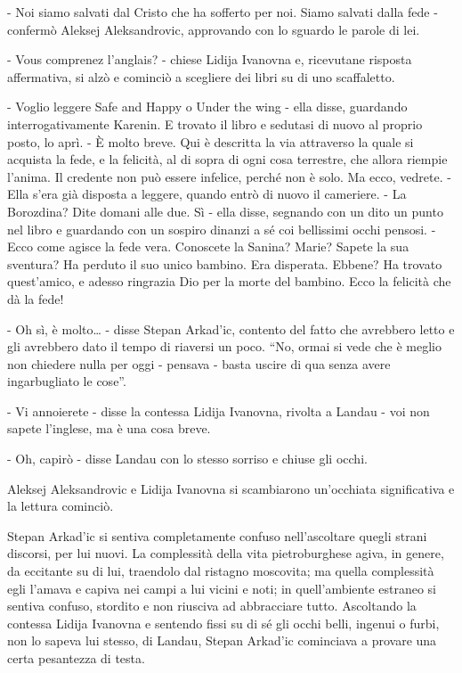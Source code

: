 - Noi siamo salvati dal Cristo che ha sofferto per noi. Siamo salvati dalla fede - confermò Aleksej Aleksandrovic, approvando con lo sguardo le parole di lei. 

- Vous comprenez l'anglais? - chiese Lidija Ivanovna e, ricevutane risposta affermativa, si alzò e cominciò a scegliere dei libri su di uno scaffaletto. 

- Voglio leggere Safe and Happy o Under the wing - ella disse, guardando interrogativamente Karenin. E trovato il libro e sedutasi di nuovo al proprio posto, lo aprì. - È molto breve. Qui è descritta la via attraverso la quale si acquista la fede, e la felicità, al di sopra di ogni cosa terrestre, che allora riempie l'anima. Il credente non può essere infelice, perché non è solo. Ma ecco, vedrete. - Ella s'era già disposta a leggere, quando entrò di nuovo il cameriere. - La Borozdina? Dite domani alle due. Sì - ella disse, segnando con un dito un punto nel libro e guardando con un sospiro dinanzi a sé coi bellissimi occhi pensosi. - Ecco come agisce la fede vera. Conoscete la Sanina? Marie? Sapete la sua sventura? Ha perduto il suo unico bambino. Era disperata. Ebbene? Ha trovato quest'amico, e adesso ringrazia Dio per la morte del bambino. Ecco la felicità che dà la fede! 

- Oh sì, è molto\ldots{} - disse Stepan Arkad'ic, contento del fatto che avrebbero letto e gli avrebbero dato il tempo di riaversi un poco. ``No, ormai si vede che è meglio non chiedere nulla per oggi - pensava - basta uscire di qua senza avere ingarbugliato le cose''. 

- Vi annoierete - disse la contessa Lidija Ivanovna, rivolta a Landau - voi non sapete l'inglese, ma è una cosa breve. 

- Oh, capirò - disse Landau con lo stesso sorriso e chiuse gli occhi. 

Aleksej Aleksandrovic e Lidija Ivanovna si scambiarono un'occhiata significativa e la lettura cominciò. 

Stepan Arkad'ic si sentiva completamente confuso nell'ascoltare quegli strani discorsi, per lui nuovi. La complessità della vita pietroburghese agiva, in genere, da eccitante su di lui, traendolo dal ristagno moscovita; ma quella complessità egli l'amava e capiva nei campi a lui vicini e noti; in quell'ambiente estraneo si sentiva confuso, stordito e non riusciva ad abbracciare tutto. Ascoltando la contessa Lidija Ivanovna e sentendo fissi su di sé gli occhi belli, ingenui o furbi, non lo sapeva lui stesso, di Landau, Stepan Arkad'ic cominciava a provare una certa pesantezza di testa. 

